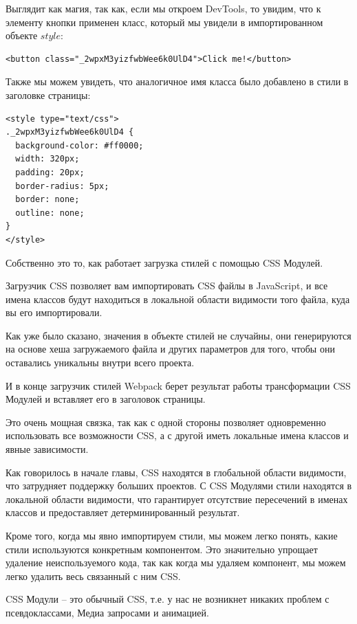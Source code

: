 Выглядит как магия, так как, если мы откроем DevTools, то увидим, что к элементу кнопки применен класс, который мы увидели в импортированном объекте $style$:

\begin{lstlisting}
<button class="_2wpxM3yizfwbWee6k0UlD4">Click me!</button>
\end{lstlisting}

Также мы можем увидеть, что аналогичное имя класса было добавлено в стили в заголовке страницы:

\begin{lstlisting}
<style type="text/css">
._2wpxM3yizfwbWee6k0UlD4 {
  background-color: #ff0000;
  width: 320px;
  padding: 20px;
  border-radius: 5px;
  border: none;
  outline: none;
} 
</style>
\end{lstlisting}

Собственно это то, как работает загрузка стилей с помощью CSS Модулей.

Загрузчик CSS позволяет вам импортировать CSS файлы в JavaScript, и все имена классов будут находиться в локальной области видимости того файла, куда вы его импортировали.

Как уже было сказано, значения в объекте стилей не случайны, они генерируются на основе хеша загружаемого файла и других параметров для того, чтобы они оставались уникальны внутри всего проекта.

И в конце загрузчик стилей Webpack берет результат работы трансформации CSS Модулей и вставляет его в заголовок страницы.

Это очень мощная связка, так как с одной стороны позволяет одновременно использовать все возможности CSS, а с другой иметь локальные имена классов и явные зависимости.

Как говорилось в начале главы, CSS находятся в глобальной области видимости, что затрудняет поддержку больших проектов. С CSS Модулями стили находятся в локальной области видимости, что гарантирует отсутствие пересечений в именах классов и предоставляет детерминированный результат.

Кроме того, когда мы явно импортируем стили, мы можем легко понять, какие стили используются конкретным компонентом. Это значительно упрощает удаление неиспользуемого кода, так как когда мы удаляем компонент, мы можем легко удалить весь связанный с ним CSS.

CSS Модули -- это обычный CSS, т.е. у нас не возникнет никаких проблем с псевдоклассами, Медиа запросами и анимацией.

